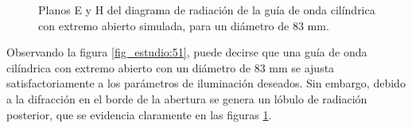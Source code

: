\begin{figure} [H]
\centering 
{}
\hspace{5mm}
\caption{Planos E y H del diagrama de radiación de la guía de onda cilíndrica con extremo abierto simulada, para un diámetro de 83 mm.}
\label{grup_fig_estudio:14}
\end{figure}
Observando la figura \ref{fig_estudio:51}, puede decirse que una guía de onda cilíndrica con extremo abierto con un diámetro de 83 mm se ajusta satisfactoriamente a los parámetros de iluminación deseados. Sin embargo, debido a la difracción en el borde de la abertura se genera un lóbulo de radiación posterior, que se evidencia claramente en las figuras \ref{grup_fig_estudio:14}.

